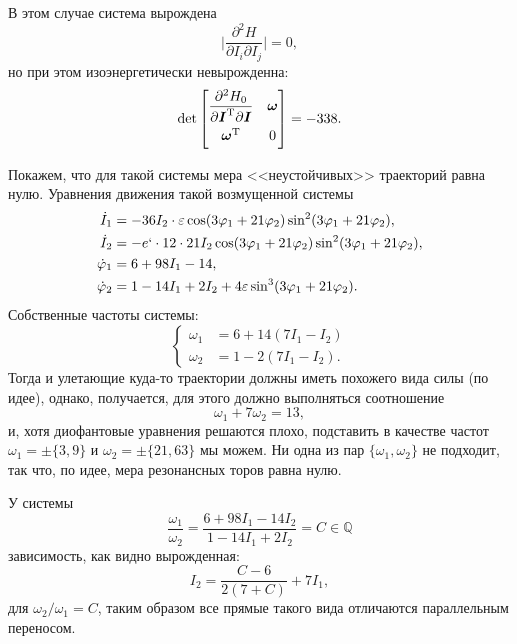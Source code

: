 В этом случае система вырождена
\begin{equation*}
        \bigg| \frac{\partial^2 H}{\partial I_i \partial I_j} \bigg| = 0,
\end{equation*}
но при этом изоэнергетически невырожденна:
\begin{equation*}
         \det \begin{bmatrix}
        \vphantom{\dfrac{1}{2}}
            \dfrac{\partial^2 H_0}{\partial \vc{I}\T \partial \vc{I}} & \vc{\omega} \\
        \vphantom{\dfrac{1}{2}}
            \vc{\omega}\T & 0
        \end{bmatrix}  = -338.
\end{equation*}

Покажем, что для такой системы мера <<неустойчивых>> траекторий равна нулю. Уравнения движения такой возмущенной системы
\begin{align*}
    \dot{I}_1 &= - 36 I_2  \cdot \varepsilon \cos(3 \varphi_1 + 21 \varphi_2) \sin^2 (3 \varphi_1 + 21 \varphi_2), \\
    \dot{I}_2 &= - e` \cdot 12 \cdot 21 I_2 \cos(3 \varphi_1 + 21 \varphi_2) \sin^2 (3 \varphi_1 + 21 \varphi_2), \\
    \dot{\varphi}_1 &= 6 + 98 I_1 - 14, \\
    \dot{\varphi}_2 &= 1 - 14 I_1 + 2 I_2 + 4 \varepsilon \sin^3 (3 \varphi_1 + 21 \varphi_2).
\end{align*}
Собственные частоты системы:
\begin{equation*}
    \left\{\begin{aligned}
        \omega_1 &= 6 + 14(7 I_1 - I_2) \\
        \omega_2 &= 1 - 2 (7I_1-I_2).
    \end{aligned}\right.
\end{equation*}
Тогда и улетающие куда-то траектории должны иметь похожего вида силы (по идее), однако, получается, для этого должно выполняться соотношение
\begin{equation*}
    \omega_1 + 7 \omega_2 = 13,
\end{equation*}
и, хотя диофантовые уравнения решаются плохо, подставить в качестве частот $\omega_1 = \pm\{3, 9\}$ и $\omega_2 = \pm \{21, 63\}$ мы можем. Ни одна из пар $\{\omega_1, \omega_2\}$ не подходит, так что, по идее, мера резонансных торов равна нулю. 

У системы 
\begin{equation*}
    \frac{\omega_1}{\omega_2} = \frac{6 + 98 I_1 - 14 I_2}{1-14 I_1 + 2 I_2} = C \in \mathbb{Q}
\end{equation*}
 зависимость, как видно вырожденная:
 \begin{equation*}
     I_2 = \frac{C-6}{2(7+C)} + 7 I_1, 
 \end{equation*}
 для $\omega_2/\omega_1 = C$, таким образом все прямые такого вида отличаются параллельным переносом.